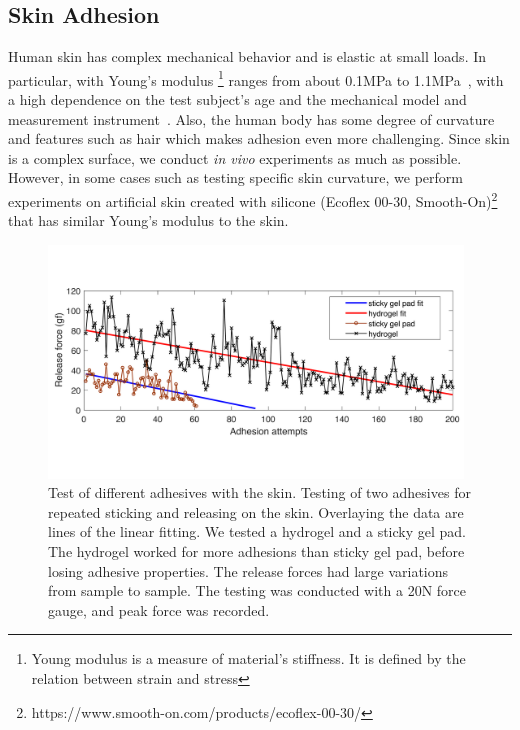 \subsection{Skin Adhesion}
Human skin has complex mechanical behavior and is elastic at small loads. In particular, with Young's modulus \footnote{Young modulus is a measure of material's stiffness. It is defined by the relation between strain and stress} ranges from about 0.1MPa to 1.1MPa~\cite{diridollou2000vivo}, with a high dependence on the test subject's age and the mechanical model and measurement instrument~\cite{agache1980mechanical}. Also, the human body has some degree of curvature and features such as hair which makes adhesion even more challenging. Since skin is a complex surface, we conduct \textit{in vivo} experiments as much as possible. However, in some cases such as testing specific skin curvature, we perform experiments on artificial skin created with silicone (Ecoflex 00-30, Smooth-On)\footnote{https://www.smooth-on.com/products/ecoflex-00-30/} that has similar Young's modulus to the skin. 

\begin{figure}[!ht]
\centering
\includegraphics[width=11.0cm]{pictures/chapter3/hydrogel.pdf}
\caption{Test of different adhesives with the skin. Testing of two adhesives for repeated sticking and releasing on the skin. Overlaying the data are lines of the linear fitting. We tested a hydrogel and a sticky gel pad. The hydrogel worked for more adhesions than sticky gel pad, before losing adhesive properties. The release forces had large variations from sample to sample. The testing was conducted with a 20N force gauge, and peak force was recorded.}
\label{fig:hydrogel}
\end{figure}


